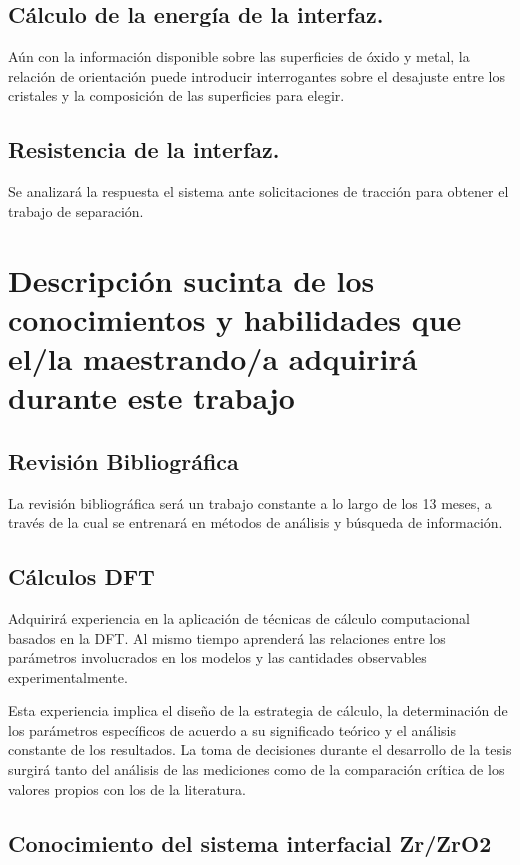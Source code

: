 \subsection{ Cálculo de la energía de la interfaz.}

Aún con la información disponible sobre las superficies de óxido y metal, la relación de 
orientación puede introducir interrogantes sobre el desajuste entre los cristales y la 
composición de las superficies para elegir. 

\subsection{Resistencia de la interfaz.}

 Se analizará la respuesta el sistema ante solicitaciones de tracción para 
obtener el trabajo de separación. 

\section{Descripción sucinta de los conocimientos y habilidades que el/la  
maestrando/a adquirirá durante este trabajo }

\subsection{ Revisión Bibliográfica}

La revisión bibliográfica será un trabajo constante a lo largo de los 13 meses, 
a través de la cual se entrenará en métodos de análisis y búsqueda de 
información.

\subsection{ Cálculos DFT}

Adquirirá experiencia en la aplicación de técnicas de cálculo computacional 
basados en la DFT. Al mismo tiempo aprenderá las relaciones entre los 
parámetros involucrados en los modelos y las cantidades observables 
experimentalmente.

Esta experiencia implica el diseño de la estrategia de cálculo, la 
determinación de los parámetros específicos de acuerdo a su significado teórico 
y el análisis constante de los resultados. La toma de decisiones durante el 
desarrollo de la tesis surgirá tanto del análisis de las mediciones como de la 
comparación crítica de los valores propios con los de la literatura.

\subsection{ Conocimiento del sistema interfacial Zr/ZrO2 }

